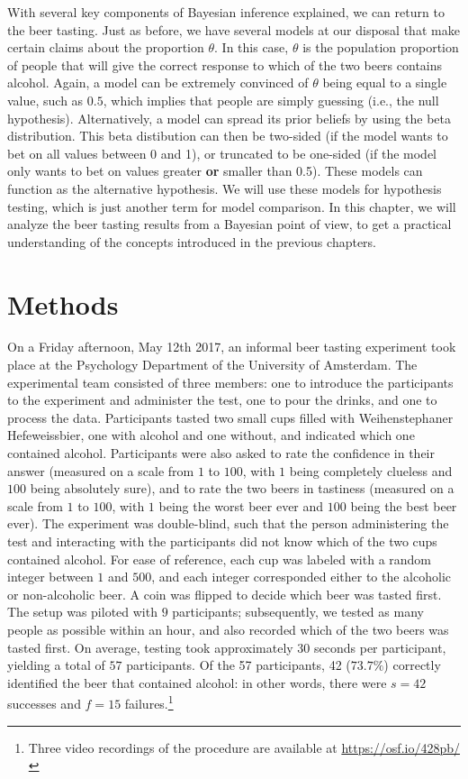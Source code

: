 \documentclass[
]{book}
\begin{document}
With several key components of Bayesian inference explained, we can return to the beer tasting. Just as before, we have several models at our disposal that make certain claims about the proportion \(\theta\). In this case, \(\theta\) is the population proportion of people that will give the correct response to which of the two beers contains alcohol. Again, a model can be extremely convinced of \(\theta\) being equal to a single value, such as \(0.5\), which implies that people are simply guessing (i.e., the null hypothesis). Alternatively, a model can spread its prior beliefs by using the beta distribution. This beta distibution can then be two-sided (if the model wants to bet on all values between 0 and 1), or truncated to be one-sided (if the model only wants to bet on values greater \textbf{or} smaller than 0.5). These models can function as the alternative hypothesis. We will use these models for hypothesis testing, which is just another term for model comparison. In this chapter, we will analyze the beer tasting results from a Bayesian point of view, to get a practical understanding of the concepts introduced in the previous chapters.

\hypertarget{methods}{%
\section{Methods}\label{methods}}

On a Friday afternoon, May 12th 2017, an informal beer tasting experiment took place at the Psychology Department of the University of Amsterdam. The experimental team consisted of three members: one to introduce the participants to the experiment and administer the test, one to pour the drinks, and one to process the data. Participants tasted two small cups filled with Weihenstephaner Hefeweissbier, one with alcohol and one without, and indicated which one contained alcohol. Participants were also asked to rate the confidence in their answer (measured on a scale from \(1\) to \(100\), with \(1\) being completely clueless and \(100\) being absolutely sure), and to rate the two beers in tastiness (measured on a scale from \(1\) to \(100\), with \(1\) being the worst beer ever and \(100\) being the best beer ever).
The experiment was double-blind, such that the person administering the test and interacting with the participants did not know which of the two cups contained alcohol. For ease of reference, each cup was labeled with a random integer between \(1\) and \(500\), and each integer corresponded either to the alcoholic or non-alcoholic beer. A coin was flipped to decide which beer was tasted first.
The setup was piloted with \(9\) participants; subsequently, we tested as many people as possible within an hour, and also recorded which of the two beers was tasted first. On average, testing took approximately 30 seconds per participant, yielding a total of \(57\) participants. Of the 57 participants, 42 (\(73.7\%\)) correctly identified the beer that contained alcohol: in other words, there were \(s = 42\) successes and \(f = 15\) failures.\footnote{Three video recordings of the procedure are available at \url{https://osf.io/428pb/}}
\end{document}
